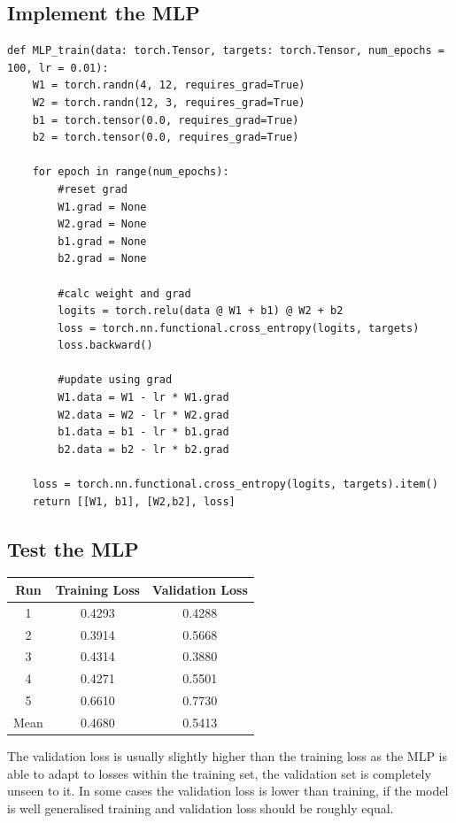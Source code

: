 \documentclass[sigconf]{acmart}
\begin{document}
\subsection{Implement the MLP}
\begin{listing}[H]
    \begin{verbatim}
def MLP_train(data: torch.Tensor, targets: torch.Tensor, num_epochs = 100, lr = 0.01):
    W1 = torch.randn(4, 12, requires_grad=True)
    W2 = torch.randn(12, 3, requires_grad=True)
    b1 = torch.tensor(0.0, requires_grad=True)
    b2 = torch.tensor(0.0, requires_grad=True)

    for epoch in range(num_epochs):
        #reset grad
        W1.grad = None
        W2.grad = None
        b1.grad = None
        b2.grad = None

        #calc weight and grad
        logits = torch.relu(data @ W1 + b1) @ W2 + b2
        loss = torch.nn.functional.cross_entropy(logits, targets)
        loss.backward()

        #update using grad
        W1.data = W1 - lr * W1.grad
        W2.data = W2 - lr * W2.grad
        b1.data = b1 - lr * b1.grad
        b2.data = b2 - lr * b2.grad

    loss = torch.nn.functional.cross_entropy(logits, targets).item()
    return [[W1, b1], [W2,b2], loss]      
    \end{verbatim}
\end{listing}
\subsection{Test the MLP}
\begin{center}
    \begin{tabular}{| c c c|}
        \hline
        Run & Training Loss & Validation Loss\\ 
        \hline\hline
        1 & 0.4293 & 0.4288 \\
        2 & 0.3914 & 0.5668 \\
        3 & 0.4314 & 0.3880\\
        4 & 0.4271 & 0.5501\\
        5 & 0.6610 & 0.7730\\
        \hline\hline
        Mean & 0.4680 & 0.5413\\
        \hline      
    \end{tabular}
\end{center}
The validation loss is usually slightly higher than the training loss as the MLP is able to adapt to losses within the training set, the validation set is completely unseen to it.
In some cases the validation loss is lower than training, if the model is well generalised training and validation loss should be roughly equal.
\end{document}
